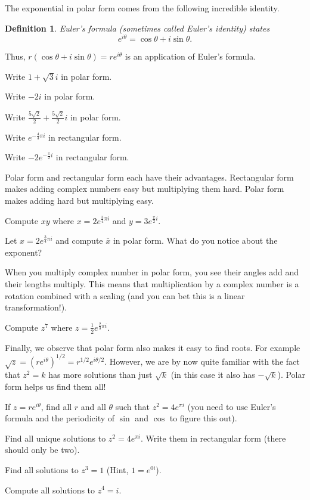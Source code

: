 \documentclass{article}
\newtheorem{definition}{Definition}
\begin{document}
	The exponential in polar form comes from the following incredible identity.
	\begin{definition}
			\emph{Euler's formula} (sometimes called Euler's identity) states
			\[
				e^{i\theta}=\cos\theta+i\sin \theta.
			\]
	\end{definition}
	Thus, $r(\cos\theta+i\sin\theta)=re^{i\theta}$ is an application of Euler's formula.

	\begin{Enum}
		\item Write $1+\sqrt{3}i$ in polar form.
		\item Write $-2i$ in polar form.
		\item Write $\frac{5\sqrt{2}}{2}+\frac{5\sqrt{2}}{2}i$ in polar form.
		\item Write $e^{-\frac{4}{3}\pi i}$ in rectangular form.
		\item Write $-2e^{-\frac{\pi}{2} i}$ in rectangular form.
	\end{Enum}

	Polar form and rectangular form each have their advantages.  
	Rectangular form makes adding complex numbers easy but multiplying them hard.
	Polar form makes adding hard but multiplying easy.

	\begin{Enum}
		\item Compute $xy$ where $x=2e^{\frac{3}{4}\pi i}$ and 
			$y=3e^{\frac{\pi}{2} i}$.
		\item Let $x=2e^{\frac{3}{4}\pi i}$ and compute $\bar x$ in polar form.
			What do you notice about the exponent?
	\end{Enum}

	When you multiply complex number in polar form, you see
	their angles add and their lengths multiply.  This means that multiplication
	by a complex number is a rotation combined with a scaling (and you can bet this
	is a linear transformation!).

	\begin{Enum}
		\item Compute $z^7$ where $z=\frac{1}{2}e^{\frac{2}{3}\pi i}$.
	\end{Enum}

	Finally, we observe that polar form also makes it easy to find roots.
	For example $\sqrt{z}=(re^{i\theta})^{1/2}=r^{1/2}e^{i\theta/2}$.
	However, we are by now quite familiar with the fact that
	$z^2=k$ has more solutions than just $\sqrt{k}$ (in this
	case it also has $-\sqrt{k}$).  Polar form helps us find them all!
	\begin{Enum}
		\item If $z=re^{i\theta}$, find
			all $r$ and all $\theta$ such that $z^2=4e^{\pi i}$ 
			(you need to use Euler's formula and the periodicity
			of $\sin$ and $\cos$ to figure this out).
		\item Find all unique solutions to $z^2=4e^{\pi i}$.
			Write them in rectangular form (there should only be two).
		\item Find all solutions to $z^3=1$ (Hint, $1=e^{0i}$).
		\item Compute all solutions to $z^4=i$.
	\end{Enum}
\end{document}
